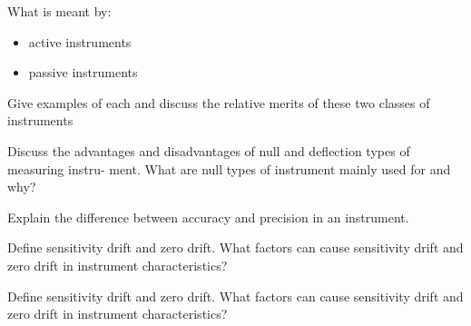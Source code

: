 \documentclass[a4paper,11pt]{book}
\begin{document}
\begin{question}
What is meant by: \\
\begin{itemize}
\item active instruments 
\item passive instruments
\end{itemize}

Give examples of each and discuss the relative merits of these two classes of instruments
\examspace*{5em}

\end{question}
\begin{solution}


\end{solution}


\begin{question}
Discuss the advantages and disadvantages of null and deflection types of measuring instru-
ment. What are null types of instrument mainly used for and why?

\examspace*{5em}

\end{question}
\begin{solution}


\end{solution}


\begin{question}
Explain the difference between accuracy and precision in an instrument.

\examspace*{5em}

\end{question}
\begin{solution}


\end{solution}

\begin{question}
Define sensitivity drift and zero drift. What factors can cause sensitivity drift and zero drift
in instrument characteristics?
\examspace*{5em}

\end{question}
\begin{solution}


\end{solution}

\begin{question}
Define sensitivity drift and zero drift. What factors can cause sensitivity drift and zero drift
in instrument characteristics?
\examspace*{5em}

\end{question}
\begin{solution}


\end{solution}
\end{document}

